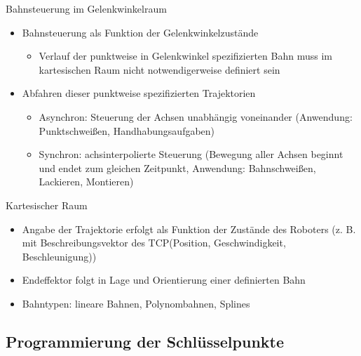 \documentclass[paper=a4, fontsize=11pt]{scrartcl} %
\numberwithin{equation}{section} %
\numberwithin{figure}{section} %
\numberwithin{table}{section} %
\begin{document}
Bahnsteuerung im Gelenkwinkelraum
\begin{itemize}
\item Bahnsteuerung als Funktion der Gelenkwinkelzustände 
\begin{itemize}
\item Verlauf der punktweise in Gelenkwinkel spezifizierten Bahn muss im kartesischen Raum nicht notwendigerweise definiert sein
\end{itemize}
\item Abfahren dieser punktweise spezifizierten Trajektorien
\begin{itemize}
\item Asynchron: Steuerung der Achsen unabhängig voneinander (Anwendung: Punktschweißen, Handhabungsaufgaben)
\item Synchron: achsinterpolierte Steuerung (Bewegung aller Achsen beginnt und endet zum gleichen Zeitpunkt, Anwendung: Bahnschweißen, Lackieren, Montieren)
\end{itemize}
\end{itemize}

Kartesischer Raum
\begin{itemize}
\item Angabe der Trajektorie erfolgt als Funktion der Zustände des Roboters (z. B. mit Beschreibungsvektor des TCP(Position, Geschwindigkeit, Beschleunigung))
\item Endeffektor folgt in Lage und Orientierung einer definierten Bahn
\item Bahntypen: lineare Bahnen, Polynombahnen, Splines
\end{itemize}

\subsection{Programmierung der Schlüsselpunkte}
\end{document}
